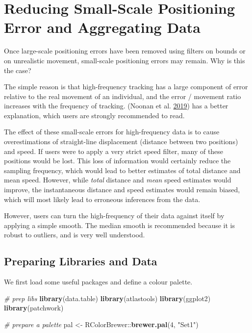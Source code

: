\documentclass[
]{scrreprt}
\newenvironment{Shaded}{}{}
\newcommand{\CommentTok}[1]{\textcolor[rgb]{0.38,0.63,0.69}{\textit{#1}}}
\newcommand{\DecValTok}[1]{\textcolor[rgb]{0.25,0.63,0.44}{#1}}
\newcommand{\KeywordTok}[1]{\textcolor[rgb]{0.00,0.44,0.13}{\textbf{#1}}}
\newcommand{\NormalTok}[1]{#1}
\newcommand{\OperatorTok}[1]{\textcolor[rgb]{0.40,0.40,0.40}{#1}}
\newcommand{\StringTok}[1]{\textcolor[rgb]{0.25,0.44,0.63}{#1}}
\begin{document}
\hypertarget{reducing-small-scale-positioning-error-and-aggregating-data}{%
\chapter{Reducing Small-Scale Positioning Error and Aggregating Data}\label{reducing-small-scale-positioning-error-and-aggregating-data}}

Once large-scale positioning errors have been removed using filters on bounds or on unrealistic movement, small-scale positioning errors may remain. Why is this the case?

The simple reason is that high-frequency tracking has a large component of error relative to the real movement of an individual, and the error / movement ratio increases with the frequency of tracking. (Noonan et al. \protect\hyperlink{ref-noonan2019}{2019}) has a better explanation, which users are strongly recommended to read.

The effect of these small-scale errors for high-frequency data is to cause overestimations of straight-line displacement (distance between two positions) and speed. If users were to apply a very strict speed filter, many of these positions would be lost. This loss of information would certainly reduce the sampling frequency, which would lead to better estimates of total distance and mean speed. However, while \emph{total} distance and \emph{mean} speed estimates would improve, the instantaneous distance and speed estimates would remain biased, which will most likely lead to erroneous inferences from the data.

However, users can turn the high-frequency of their data against itself by applying a simple smooth. The median smooth is recommended because it is robust to outliers, and is very well understood.

\hypertarget{preparing-libraries-and-data}{%
\section{Preparing Libraries and Data}\label{preparing-libraries-and-data}}

We first load some useful packages and define a colour palette.

\begin{Shaded}
\begin{Highlighting}[]
\CommentTok{\# prep libs}
\KeywordTok{library}\NormalTok{(data.table)}
\KeywordTok{library}\NormalTok{(atlastools)}
\KeywordTok{library}\NormalTok{(ggplot2)}
\KeywordTok{library}\NormalTok{(patchwork)}

\CommentTok{\# prepare a palette}
\NormalTok{pal <{-}}\StringTok{ }\NormalTok{RColorBrewer}\OperatorTok{::}\KeywordTok{brewer.pal}\NormalTok{(}\DecValTok{4}\NormalTok{, }\StringTok{"Set1"}\NormalTok{)}
\end{Highlighting}
\end{Shaded}
\end{document}
